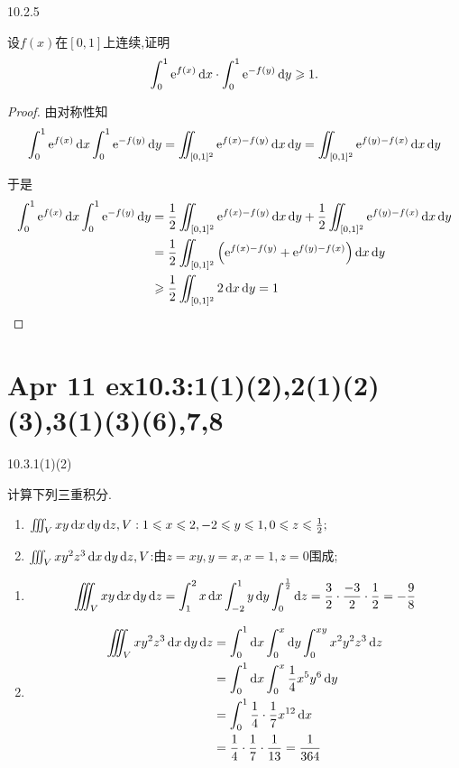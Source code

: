 \begin{exercise}
    {10.2.5}

    设$f(x)$在$[0,1]$上连续,证明
    $$
    \int_0^1 \mathrm{e}^{f(x)} \operatorname{d\!} x \cdot \int_0^1 \mathrm{e}^{- f(y)} \operatorname{d\!} y \geqslant 1.
    $$
\end{exercise}

\begin{proof}
    由对称性知
\[
\int_0^1 \mathrm{e}^{f(x)} \operatorname{d\!} x \int_0^1 \mathrm{e}^{-f(y)} \operatorname{d\!} y 
= \iint_{[0,1]^2} \mathrm{e}^{f(x) - f(y)} \operatorname{d\!} x \operatorname{d\!} y 
= \iint_{[0,1]^2} \mathrm{e}^{f(y) - f(x)} \operatorname{d\!} x \operatorname{d\!} y
\]

于是
\begin{align*}
\int_0^1 \e^{f(x)} \dif x \int_0^1 \e^{-f(y)} \dif y 
&= \frac{1}{2} \iint_{[0,1]^2} \e^{f(x) - f(y)} \dif x \dif y 
+ \frac{1}{2} \iint_{[0,1]^2} \e^{f(y) - f(x)} \dif x \dif y \\
&= \frac{1}{2} \iint_{[0,1]^2} \left( \e^{f(x) - f(y)} + \e^{f(y) - f(x)} \right) \dif x \dif y \\
&\ge \frac{1}{2} \iint_{[0,1]^2} 2 \dif x \dif y = 1
\end{align*}
\end{proof}






\section{Apr 11 ex10.3:1(1)(2),2(1)(2)(3),3(1)(3)(6),7,8}



\begin{exercise}
    {10.3.1(1)(2)}

    计算下列三重积分.
    \begin{enumerate}
        \item $\iiint_V xy \operatorname{d\!} x \operatorname{d\!} y \operatorname{d\!} z, V: 1 \leqslant x \leqslant 2, -2 \leqslant y \leqslant 1, 0 \leqslant z \leqslant \frac{1}{2};$
        \item $\iiint_V xy^2 z^3 \operatorname{d\!} x \operatorname{d\!} y \operatorname{d\!} z, V$:由$z=xy, y=x, x=1, z= 0$围成;
    \end{enumerate}
\end{exercise}

\begin{solution}
    \begin{enumerate}
        \item $$\iiint_V xy \operatorname{d\!} x \operatorname{d\!} y \operatorname{d\!} z = \int_1^2 x \operatorname{d\!} x \int_{-2}^1 y \operatorname{d\!} y \int_0^{\frac{1}{2}} \operatorname{d\!} z = \frac{3}{2} \cdot \frac{-3}{2} \cdot \frac{1}{2} = - \frac{9}{8}$$
        \item \begin{align*}
            \iiint_V xy^2 z^3 \dif x \dif y \dif z 
            &= \int_0^1 \dif x \int_0^x \dif y \int_0^{xy} x^2 y^2 z^3 \dif z\\
            &= \int_0^1 \dif x \int_0^x \frac{1}{4} x^5 y^6 \dif y \\
            &= \int_0^1 \frac{1}{4} \cdot \frac{1}{7} x^{12} \dif x \\
            &= \frac{1}{4} \cdot \frac{1}{7} \cdot \frac{1}{13} = \frac{1}{364}
        \end{align*}
    \end{enumerate}
\end{solution}

